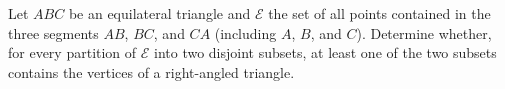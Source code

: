 Let $ABC$ be an equilateral triangle and $\mathcal{E}$ the set of all points contained in the three segments $AB$,  $BC$,  and $CA$ (including $A$,  $B$,  and $C$).  Determine whether, for every partition of $\mathcal{E}$ into two disjoint subsets, at least one of the two subsets contains the vertices of a right-angled triangle.